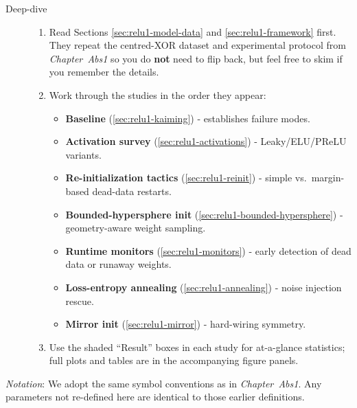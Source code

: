 \begin{description}
  \item[Deep-dive]
        \begin{enumerate}
          \item Read Sections \ref{sec:relu1-model-data} and \ref{sec:relu1-framework} first.  
                They repeat the centred-XOR dataset and experimental protocol from \emph{Chapter~Abs1} so you do \textbf{not} need to flip back, but feel free to skim if you remember the details.
          \item Work through the studies in the order they appear:
                \begin{itemize}
                    \item \textbf{Baseline} (\ref{sec:relu1-kaiming})  
                          - establishes failure modes.
                    \item \textbf{Activation survey} (\ref{sec:relu1-activations})  
                          - Leaky/ELU/PReLU variants.
                    \item \textbf{Re-initialization tactics} (\ref{sec:relu1-reinit})  
                          - simple vs.\ margin-based dead-data restarts.
                    \item \textbf{Bounded-hypersphere init} (\ref{sec:relu1-bounded-hypersphere})  
                          - geometry-aware weight sampling.
                    \item \textbf{Runtime monitors} (\ref{sec:relu1-monitors})  
                          - early detection of dead data or runaway weights.
                    \item \textbf{Loss-entropy annealing} (\ref{sec:relu1-annealing})  
                          - noise injection rescue.
                    \item \textbf{Mirror init} (\ref{sec:relu1-mirror})  
                          - hard-wiring symmetry.
                \end{itemize}
          \item Use the shaded “Result” boxes in each study for at-a-glance statistics; full plots and tables are in the accompanying figure panels.
        \end{enumerate}
\end{description}

\medskip\noindent
\textit{Notation}: We adopt the same symbol conventions as in \emph{Chapter~Abs1}.  Any parameters not re-defined here are identical to those earlier definitions.
